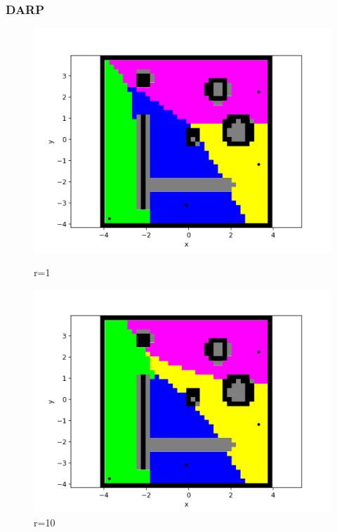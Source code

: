 \documentclass{beamer}
\begin{document}
	
	\begin{frame}
		\frametitle{DARP}
		\begin{figure}[H]
			\begin{minipage}{0.3\textwidth}
				\includegraphics[width=\linewidth]{DARPImages/0}
				\caption{r=1}
			\end{minipage}
			\hspace{\fill} %
			\begin{minipage}{0.3\textwidth}
				\includegraphics[width=\linewidth]{DARPImages/10}
				\caption{r=10}
			\end{minipage}
			\hspace{\fill} %
			\begin{minipage}{0.3\textwidth}

\end{minipage}
\end{figure}
\end{frame}
\end{document}
